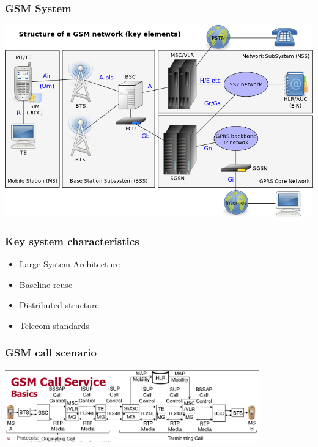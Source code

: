 \documentclass{beamer}
\begin{document}
\begin{frame}
	\frametitle{GSM System}
	\begin{center}
		\includegraphics[width=\columnwidth]{images/mobile_arts/gsm.png}
	\end{center}
\end{frame}

\begin{frame}
	\frametitle{Key system characteristics}

	\begin{itemize}
	
	\item
	Large System Architecture

	\item
	Baseline reuse

	\item
	Distributed structure

	\item
	Telecom standards

	\end{itemize}

\end{frame}

\begin{frame}
	\frametitle{GSM call scenario}

 	\begin{center}
		\includegraphics[width=11cm]{images/mobile_arts/gsm_call.png}
	\end{center}

\end{frame}
\end{document}
